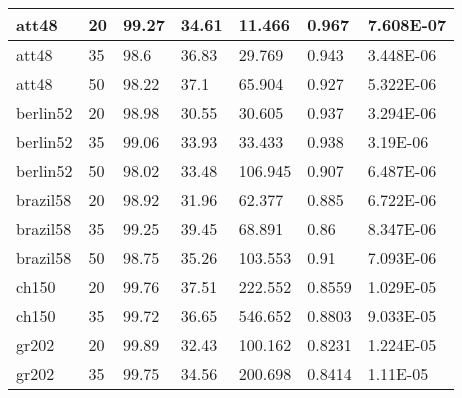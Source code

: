 \documentclass{llncs}
\begin{document}
\begin{center}
\begin{longtable}{|l|l|l|l|l|l|l|}
\endlastfoot


\hline	att48	&	20	&	99.27	&	34.61	&	11.466	&	0.967	&	7.608E-07	\\
\hline	att48	&	35	&	98.6	&	36.83	&	29.769	&	0.943	&	3.448E-06	\\
\hline	att48	&	50	&	98.22	&	37.1	&	65.904	&	0.927	&	5.322E-06	\\
\hline	berlin52	&	20	&	98.98	&	30.55	&	30.605	&	0.937	&	3.294E-06	\\
\hline	berlin52	&	35	&	99.06	&	33.93	&	33.433	&	0.938	&	3.19E-06	\\
\hline	berlin52	&	50	&	98.02	&	33.48	&	106.945	&	0.907	&	6.487E-06	\\
\hline	brazil58	&	20	&	98.92	&	31.96	&	62.377	&	0.885	&	6.722E-06	\\
\hline	brazil58	&	35	&	99.25	&	39.45	&	68.891	&	0.86	&	8.347E-06	\\
\hline	brazil58	&	50	&	98.75	&	35.26	&	103.553	&	0.91	&	7.093E-06	\\
\hline	ch150	&	20	&	99.76	&	37.51	&	222.552	&	0.8559	&	1.029E-05	\\
\hline	ch150	&	35	&	99.72	&	36.65	&	546.652	&	0.8803	&	9.033E-05	\\
\hline	gr202	&	20	&	99.89	&	32.43	&	100.162	&	0.8231	&	1.224E-05	\\
\hline	gr202	&	35	&	99.75	&	34.56	&	200.698	&	0.8414	&	1.11E-05	\\

\end{longtable}
\end{center}
\end{document}
